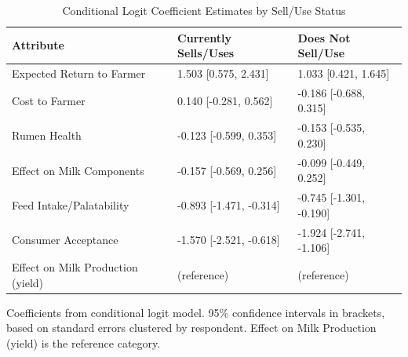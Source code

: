\begin{table}[!h]
\centering
\caption{\label{tab:bws_robustness_selluse}Conditional Logit Coefficient Estimates by Sell/Use Status}
\centering
\begin{threeparttable}
\begin{tabular}[t]{lll}
\toprule
Attribute & Currently Sells/Uses & Does Not Sell/Use\\
\midrule
Expected Return to Farmer & 1.503 [0.575, 2.431] & 1.033 [0.421, 1.645]\\
Cost to Farmer & 0.140 [-0.281, 0.562] & -0.186 [-0.688, 0.315]\\
Rumen Health & -0.123 [-0.599, 0.353] & -0.153 [-0.535, 0.230]\\
Effect on Milk Components & -0.157 [-0.569, 0.256] & -0.099 [-0.449, 0.252]\\
Feed Intake/Palatability & -0.893 [-1.471, -0.314] & -0.745 [-1.301, -0.190]\\
\addlinespace
Consumer Acceptance & -1.570 [-2.521, -0.618] & -1.924 [-2.741, -1.106]\\
Effect on Milk Production (yield) & (reference) & (reference)\\
\bottomrule
\end{tabular}
\begin{tablenotes}
\item Coefficients from conditional logit model. 95\% confidence intervals in brackets, based on standard errors clustered by respondent. Effect on Milk Production (yield) is the reference category.
\end{tablenotes}
\end{threeparttable}
\end{table}
